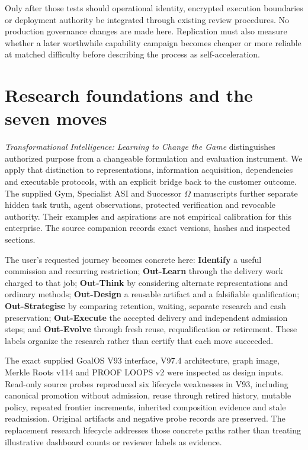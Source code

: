 \documentclass[11pt,letterpaper]{article}
\begin{document}
Only after those tests should operational identity, encrypted execution boundaries or deployment authority be integrated through existing review procedures. No production governance changes are made here. Replication must also measure whether a later worthwhile capability campaign becomes cheaper or more reliable at matched difficulty before describing the process as self-acceleration.

\appendix
\section{Research foundations and the seven moves}

\emph{Transformational Intelligence: Learning to Change the Game} distinguishes authorized purpose from a changeable formulation and evaluation instrument. We apply that distinction to representations, information acquisition, dependencies and executable protocols, with an explicit bridge back to the customer outcome. The supplied Gym, Specialist ASI and Successor $\Omega$ manuscripts further separate hidden task truth, agent observations, protected verification and revocable authority. Their examples and aspirations are not empirical calibration for this enterprise. The source companion records exact versions, hashes and inspected sections.\cite{ti,gym,navigator}

The user's requested journey becomes concrete here: \textbf{Identify} a useful commission and recurring restriction; \textbf{Out-Learn} through the delivery work charged to that job; \textbf{Out-Think} by considering alternate representations and ordinary methods; \textbf{Out-Design} a reusable artifact and a falsifiable qualification; \textbf{Out-Strategise} by comparing retention, waiting, separate research and cash preservation; \textbf{Out-Execute} the accepted delivery and independent admission steps; and \textbf{Out-Evolve} through fresh reuse, requalification or retirement. These labels organize the research rather than certify that each move succeeded.

The exact supplied GoalOS V93 interface, V97.4 architecture, graph image, Merkle Roots v114 and PROOF LOOPS v2 were inspected as design inputs. Read-only source probes reproduced six lifecycle weaknesses in V93, including canonical promotion without admission, reuse through retired history, mutable policy, repeated frontier increments, inherited composition evidence and stale readmission. Original artifacts and negative probe records are preserved. The replacement research lifecycle addresses those concrete paths rather than treating illustrative dashboard counts or reviewer labels as evidence.\cite{v97,merkle,proofloops}
\end{document}
